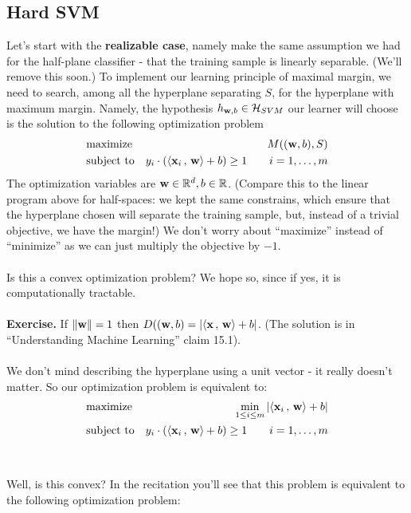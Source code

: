  \subsection{Hard SVM}
 Let's start with the {\bf realizable case}, namely make the same assumption we
 had for the half-plane classifier - that the training sample is linearly
 separable. (We'll remove this soon.)
 To implement our learning principle of maximal margin, we need to search, among
 all the hyperplane separating $S$, for the hyperplane with maximum margin. 
 Namely, the hypothesis $h_{\mathbf{w},b} \in
 \mathcal{H}_{SVM}$ our learner will choose is the solution to the following
 optimization problem
  \begin{eqnarray*}
      & \text{maximize}   &  M( (\mathbf{w},b) , S) \\
     & \text{subject to} &  y_i \cdot \left( {\left\langle \mathbf{x}_i\,,\,\mathbf{w} \right\rangle}
      +b \right) \geq 1  \qquad 
i=1,\ldots,m
    \end{eqnarray*}
    The optimization variables are $\mathbf{w}\in\mathbb{R}^d,b\in\mathbb{R}$. (Compare this
      to the linear program above for half-spaces: we kept the same constrains,
      which ensure that the hyperplane chosen will separate the training sample,
    but, instead of a trivial objective, we have the margin!) We don't worry
    about ``maximize'' instead of ``minimize'' as we can just multiply the
    objective by $-1$. 
\\~\\
Is this a convex optimization problem? We hope so, since if yes, it is
computationally tractable. 
\\~\\
{\bf Exercise.} If $\left\| \mathbf{w}\right\|=1$ then $ D( (\mathbf{w},b) = 
  |{\left\langle \mathbf{x}\,,\,\mathbf{w} \right\rangle}+b|$.  (The solution is in ``Understanding Machine
  Learning'' claim 15.1).
\\~\\
We don't mind describing the hyperplane using a unit vector - it really doesn't
matter. So our optimization problem is equivalent to:
\begin{eqnarray*}
  & \text{maximize}   &  \min_{1\leq i\leq m} |{\left\langle \mathbf{x}_i\,,\,\mathbf{w} \right\rangle}+b| \\
     & \text{subject to} &  y_i \cdot \left( {\left\langle \mathbf{x}_i\,,\,\mathbf{w} \right\rangle}
      +b \right) \geq 1  \qquad 
i=1,\ldots,m
    \end{eqnarray*}
    \\~\\ Well, is this convex? In the recitation you'll see that this problem
    is equivalent to the following optimization problem:
